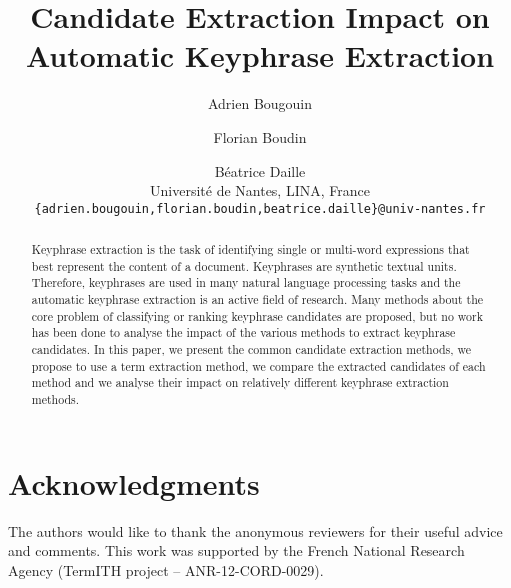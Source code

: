 \documentclass[11pt]{article}
\title{Candidate Extraction Impact on Automatic Keyphrase Extraction}
\author{
  Adrien Bougouin \and Florian Boudin \and Béatrice Daille\\
  Université de Nantes, LINA, France\\
  {\tt \{adrien.bougouin,florian.boudin,beatrice.daille\}@univ-nantes.fr}
}
\date{}
\begin{document}
  \maketitle
  \begin{abstract}
    Keyphrase extraction is the task of identifying single or multi-word
    expressions that best represent the content of a document. Keyphrases are
    synthetic textual units. Therefore, keyphrases are used in many natural
    language processing tasks and the automatic keyphrase extraction is an
    active field of research. Many methods about the core problem of classifying
    or ranking keyphrase candidates are proposed, but no work has been done to
    analyse the impact of the various methods to extract keyphrase candidates.
    In this paper, we present the common candidate extraction methods, we
    propose to use a term extraction method, we compare the extracted candidates
    of each method and we analyse their impact on relatively different keyphrase
    extraction methods.
  \end{abstract}

  

  \section*{Acknowledgments}
  The authors would like to thank the anonymous reviewers for their useful
  advice and comments. This work was supported by the French National Research
  Agency (TermITH project -- ANR-12-CORD-0029).

  
  
\end{document}
